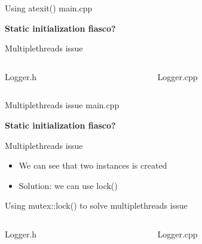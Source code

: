 \documentclass[13pt]{beamer}
\begin{document}
\begin{frame}{Using atexit()}
main.cpp
\lstset{basicstyle=\tiny,style=myCustomCppStyle}

\textbf{Static initialization fiasco?}
\end{frame}

\begin{frame}{Multiplethreads issue}
\begin{columns}[T]
\begin{column}{.45\textwidth}
Logger.h
\lstset{basicstyle=\tiny,style=myCustomCppStyle}

\end{column}

\begin{column}{.45\textwidth}
Logger.cpp
\lstset{basicstyle=\tiny,style=myCustomCppStyle}

\end{column}
\end{columns}
\end{frame}

\begin{frame}{Multiplethreads issue}
main.cpp
\lstset{basicstyle=\tiny,style=myCustomCppStyle}

\textbf{Static initialization fiasco?}
\end{frame}

\begin{frame}{Multiplethreads issue}
\begin{itemize}
	\setlength\itemsep{1em}
	\item We can see that two instances is created
	\item Solution: we can use lock()
\end{itemize}
\end{frame}

\begin{frame}{Using mutex::lock() to solve multiplethreads issue}
\begin{columns}[T]
\begin{column}{.45\textwidth}
Logger.h
\lstset{basicstyle=\tiny,style=myCustomCppStyle}

\end{column}

\begin{column}{.45\textwidth}
Logger.cpp
\lstset{basicstyle=\tiny,style=myCustomCppStyle}

\end{column}
\end{columns}
\end{frame}
\end{document}
